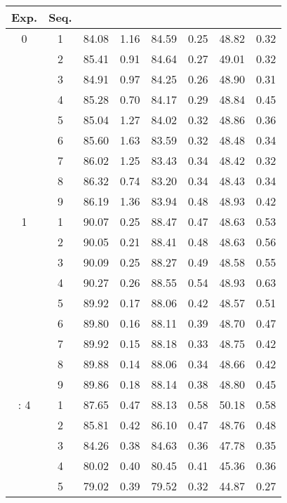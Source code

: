 \begin{table}[htbp]
  \begin{center}
  \begin{scriptsize}
	\begin{tabular}{|c|c|cc|cc|cc|}
	  \hline
	  \textbf{Exp}. & \textbf{Seq.} & \misd{6}{10} & \sisd{6}{10} & \misd{6}{11} & \sisd{6}{11} & \misd{6}{12} & \sisd{6}{12}\\
	  \hline
	  0 & 1 & 84.08 & 1.16 & 84.59 & 0.25 & 48.82 & 0.32\\
		& 2 & 85.41 & 0.91 & 84.64 & 0.27 & 49.01 & 0.32\\
		& 3 & 84.91 & 0.97 & 84.25 & 0.26 & 48.90 & 0.31\\
		& 4 & 85.28 & 0.70 & 84.17 & 0.29 & 48.84 & 0.45\\
		& 5 & 85.04 & 1.27 & 84.02 & 0.32 & 48.86 & 0.36\\
		& 6 & 85.60 & 1.63 & 83.59 & 0.32 & 48.48 & 0.34\\
		& 7 & 86.02 & 1.25 & 83.43 & 0.34 & 48.42 & 0.32\\
		& 8 & 86.32 & 0.74 & 83.20 & 0.34 & 48.43 & 0.34\\
		& 9 & 86.19 & 1.36 & 83.94 & 0.48 & 48.93 & 0.42\\
	  \hline
	  1 & 1 & 90.07 & 0.25 & 88.47 & 0.47 & 48.63 & 0.53\\
		& 2 & 90.05 & 0.21 & 88.41 & 0.48 & 48.63 & 0.56\\
		& 3 & 90.09 & 0.25 & 88.27 & 0.49 & 48.58 & 0.55\\
		& 4 & 90.27 & 0.26 & 88.55 & 0.54 & 48.93 & 0.63\\
		& 5 & 89.92 & 0.17 & 88.06 & 0.42 & 48.57 & 0.51\\
		& 6 & 89.80 & 0.16 & 88.11 & 0.39 & 48.70 & 0.47\\
		& 7 & 89.92 & 0.15 & 88.18 & 0.33 & 48.75 & 0.42\\
		& 8 & 89.88 & 0.14 & 88.06 & 0.34 & 48.66 & 0.42\\
		& 9 & 89.86 & 0.18 & 88.14 & 0.38 & 48.80 & 0.45\\
	  \hline: 
	  4 & 1 & 87.65 & 0.47 & 88.13 & 0.58 & 50.18 & 0.58\\ 
		& 2 & 85.81 & 0.42 & 86.10 & 0.47 & 48.76 & 0.48\\ 
		& 3 & 84.26 & 0.38 & 84.63 & 0.36 & 47.78 & 0.35\\ 
		& 4 & 80.02 & 0.40 & 80.45 & 0.41 & 45.36 & 0.36\\ 
		& 5 & 79.02 & 0.39 & 79.52 & 0.32 & 44.87 & 0.27\\ 

\end{tabular}
\end{scriptsize}
\end{center}
\end{table}
